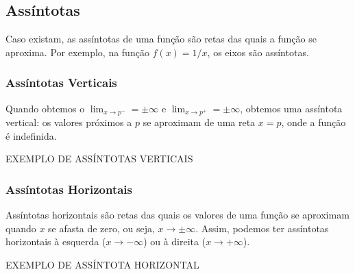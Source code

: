\subsection{Assíntotas}
Caso existam, as assíntotas de uma função são retas das quais a função se aproxima. Por exemplo, na função $f(x)=1/x$, os eixos são assíntotas.
\subsubsection{Assíntotas Verticais}
Quando obtemos o $\lim_{x\rightarrow p^-}= \pm \infty$ e $\lim_{x\rightarrow p^+}= \pm \infty$, obtemos uma assíntota vertical: os valores próximos a $p$ se aproximam de uma reta $x=p$, onde a função é indefinida.
\begin{exemplo}
EXEMPLO DE ASSÍNTOTAS VERTICAIS %
\end{exemplo}

\subsubsection{Assíntotas Horizontais}
Assíntotas horizontais são retas das quais os valores de uma função se aproximam quando $x$ se afasta de zero, ou seja, $x \rightarrow \pm \infty$. Assim, podemos ter assíntotas horizontais à esquerda ($x\rightarrow - \infty$) ou à direita ($x\rightarrow + \infty$).
\begin{exemplo}
EXEMPLO DE ASSÍNTOTA HORIZONTAL
\end{exemplo}

